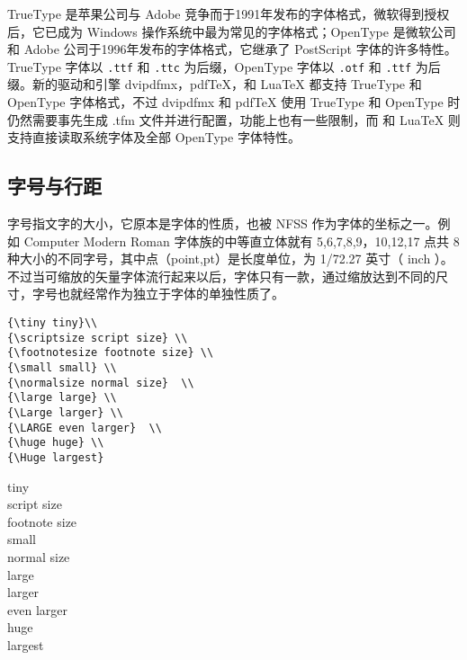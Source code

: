 {\qquad TrueType 是苹果公司与 Adobe 竞争而于1991年发布的字体格式，微软得到授权后，它已成为 Windows 操作系统中最为常见的字体格式；OpenType 是微软公司和 Adobe 公司于1996年发布的字体格式，它继承了 PostScript 字体的许多特性。TrueType 字体以 \lstinline{.ttf} 和 \lstinline{.ttc} 为后缀，OpenType 字体以 \lstinline{.otf} 和 \lstinline{.ttf} 为后缀。新的驱动和引擎 dvipdfmx，pdfTeX，\XeTeX 和 LuaTeX 都支持 TrueType 和 OpenType 字体格式，不过 dvipdfmx 和 pdfTeX 使用 TrueType
和 OpenType 时仍然需要事先生成 .tfm 文件并进行配置，功能上也有一些限制，而 \XeTeX 和 LuaTeX 则支持直接读取系统字体及全部 OpenType 字体特性。
}

\subsection{字号与行距}

字号指文字的大小，它原本是字体的性质，也被 NFSS 作为字体的坐标之一。例如 Computer Modern Roman 字体族的中等直立体就有 5,6,7,8,9，10,12,17 点共 8 种大小的不同字号，其中点（point,pt）是长度单位，为 1/72.27 英寸（ inch ）。不过当可缩放的矢量字体流行起来以后，字体只有一款，通过缩放达到不同的尺寸，字号也就经常作为独立于字体的单独性质了。

\begin{minipage}[t]{0.45\textwidth}
\begin{lstlisting}
{\tiny tiny}\\
{\scriptsize script size} \\ 
{\footnotesize footnote size} \\ 
{\small small} \\ 
{\normalsize normal size}  \\  
{\large large} \\ 
{\Large larger} \\  
{\LARGE even larger}  \\ 
{\huge huge} \\ 
{\Huge largest}
\end{lstlisting}
\end{minipage}
\hfill
\begin{minipage}[t]{0.45\textwidth}
    {\tiny tiny}\\
    {\scriptsize script size} \\ 
    {\footnotesize footnote size} \\ 
    {\small small} \\ 
    {\normalsize normal size}  \\  
    {\large large} \\ 
    {\Large larger} \\  
    {\LARGE even larger}  \\ 
    {\huge huge} \\ 
    {\Huge largest}
\end{minipage}

